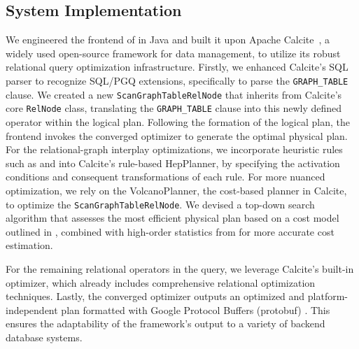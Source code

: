 \subsection{System Implementation}
We engineered the frontend of \name in Java and built it upon Apache Calcite~\cite{calcite}, a widely used open-source framework for data management, to utilize its robust relational query optimization infrastructure.
Firstly, we enhanced Calcite's SQL parser to recognize SQL/PGQ extensions, specifically to parse the \lstinline{GRAPH_TABLE} clause.
We created a new \lstinline{ScanGraphTableRelNode} that inherits from Calcite's core \lstinline{RelNode} class, translating the \lstinline{GRAPH_TABLE} clause into this newly defined operator within the logical plan.
Following the formation of the logical plan, the frontend invokes the converged optimizer to generate the optimal physical plan.
For the relational-graph interplay optimizations, we incorporate heuristic rules such as \filterrule and \joinfuserule into Calcite's rule-based HepPlanner, by specifying the activation conditions and consequent transformations of each rule.
For more nuanced optimization, we rely on the VolcanoPlanner, the cost-based planner in Calcite, to optimize the \lstinline{ScanGraphTableRelNode}.
We devised a top-down search algorithm that assesses the most efficient physical plan based on a cost model outlined in , combined with high-order statistics from \glogue for more accurate cost estimation.

For the remaining relational operators in the query, we leverage Calcite's built-in optimizer, which already includes comprehensive relational optimization techniques.
Lastly, the converged optimizer outputs an optimized and platform-independent plan formatted with Google Protocol Buffers (protobuf) \cite{protobuf}. This ensures the adaptability of the \name framework's output to a variety of backend database systems.

